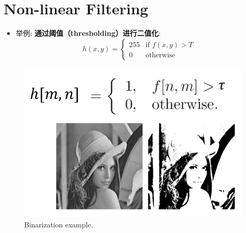 \section{Non-linear Filtering}
\begin{itemize}
    \item 举例: \textbf{通过阈值（thresholding）进行二值化}:
    $$
    h(x,y) = 
    \begin{cases} 
    255 & \text{if } f(x,y) > T \\
    0   & \text{otherwise}
    \end{cases}
    $$
\end{itemize}

\begin{figure}[htbp]
    \centering
    \includegraphics[scale=0.4]{figures/BinarizationviaThresholding.png}
    \caption{Binarization example.}
\end{figure}